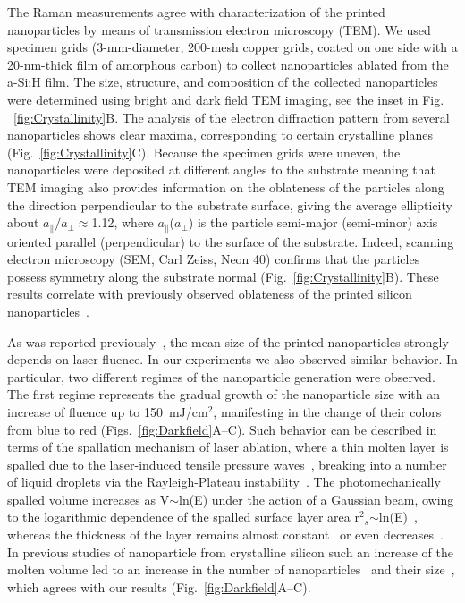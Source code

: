                 The Raman measurements agree with characterization of the printed nanoparticles by means of transmission electron
            microscopy (TEM). We used specimen grids (3-mm-diameter, 200-mesh copper grids, coated on one side with a 20-nm-thick
            film of amorphous carbon) to collect nanoparticles ablated from the a-Si:H film. The size, structure, and composition
            of the collected nanoparticles were determined using bright and dark field TEM imaging, see the inset in Fig.
            ~\ref{fig:Crystallinity}B. The analysis of the electron diffraction pattern from several nanoparticles shows clear maxima,
            corresponding to certain crystalline planes (Fig.~\ref{fig:Crystallinity}C). Because the specimen grids were uneven, the
            nanoparticles were deposited at different angles to the substrate meaning that TEM imaging also provides information
            on the oblateness of the particles along the direction perpendicular to the substrate surface, giving the average
            ellipticity about $a_{\parallel}/a_{\perp}\approx$1.12, where $a_{\parallel}$($a_{\perp}$) is the particle semi-major
            (semi-minor) axis oriented parallel (perpendicular) to the surface of the substrate. Indeed, scanning electron
            microscopy (SEM, Carl Zeiss, Neon 40) confirms that the particles possess  symmetry along the substrate
            normal (Fig.~\ref{fig:Crystallinity}B). These results correlate with previously observed oblateness of the printed silicon
            nanoparticles~\cite{zywietz2014laser}.

                As was reported previously~\cite{zywietz2014laser, zywietz2014generation}, the mean size of the printed nanoparticles
            strongly depends on laser fluence. In our experiments we also observed similar behavior. In particular, two different
            regimes of the nanoparticle generation were observed. The first regime represents the gradual growth of the nanoparticle
            size with an increase of fluence up to 150~mJ/cm$^{2}$, manifesting in the change of their colors from blue to red
            (Figs.~\ref{fig:Darkfield}A--C). Such behavior can be described in terms of the spallation mechanism of laser ablation, where
            a thin molten layer is spalled due to the laser-induced tensile pressure waves~\cite{ionin2013thermal,wu2014microscopic},
            breaking into a number of liquid droplets via the Rayleigh-Plateau instability~\cite{papageorgiou1995breakup}.
            The photomechanically spalled volume increases as V$\sim$ln(E) under the action of a Gaussian beam, owing to the
            logarithmic dependence of the spalled surface layer area r$^{2}$$_{s}$$\sim$ln(E)~\cite{bauerle2013laser}, whereas
            the thickness of the layer remains almost constant~\cite{ionin2013thermal} or even decreases~\cite{wu2014microscopic}.
            In previous studies of nanoparticle  from crystalline silicon such an increase of the molten volume led
            to an increase in the number of nanoparticles~\cite{zywietz2014generation} and their size~\cite{zywietz2014laser},
            which agrees with our results (Fig.~\ref{fig:Darkfield}A--C).

